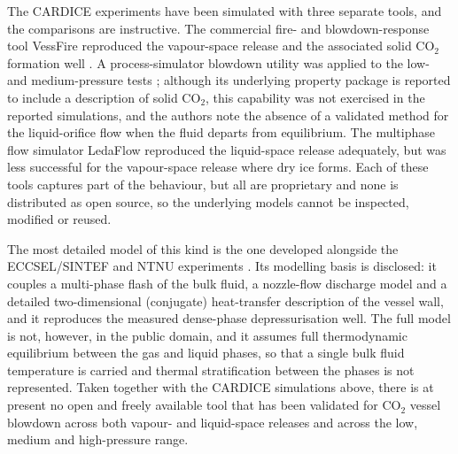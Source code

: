 \documentclass[5p,authoryear]{elsarticle}
\begin{document}
The CARDICE experiments have been simulated with three separate tools, and the comparisons are
instructive. The commercial fire- and blowdown-response tool VessFire \citep{Vessfire} reproduced
the vapour-space release and the associated solid CO$_2$ formation well \citep{Vaillant2021}. A
process-simulator blowdown utility was applied to the low- and medium-pressure tests
\citep{Drescher2022}; although its underlying property package is reported to include a
description of solid CO$_2$, this capability was not exercised in the reported simulations, and
the authors note the absence of a validated method for the liquid-orifice flow when the fluid
departs from equilibrium. The multiphase flow simulator LedaFlow \citep{Teberikler2022}
reproduced the liquid-space release adequately, but was less successful for the vapour-space
release where dry ice forms. Each of these tools captures part of the behaviour, but all are
proprietary and none is distributed as open source, so the underlying models cannot be inspected,
modified or reused.

The most detailed model of this kind is the one developed alongside the ECCSEL/SINTEF and NTNU experiments
\citep{Hoydalsvik2026}. Its modelling basis is disclosed: it couples a multi-phase flash of the
bulk fluid, a nozzle-flow discharge model and a detailed two-dimensional (conjugate) heat-transfer
description of the vessel wall, and it reproduces the measured dense-phase depressurisation well.
The full model is not, however, in the public domain, and it assumes full thermodynamic equilibrium
between the gas and liquid phases, so that a single bulk fluid temperature is carried and thermal
stratification between the phases is not represented. Taken together with the CARDICE simulations
above, there is at present no open and freely available tool that has been validated for CO$_2$
vessel blowdown across both vapour- and liquid-space releases and across the low, medium and
high-pressure range.
\end{document}
